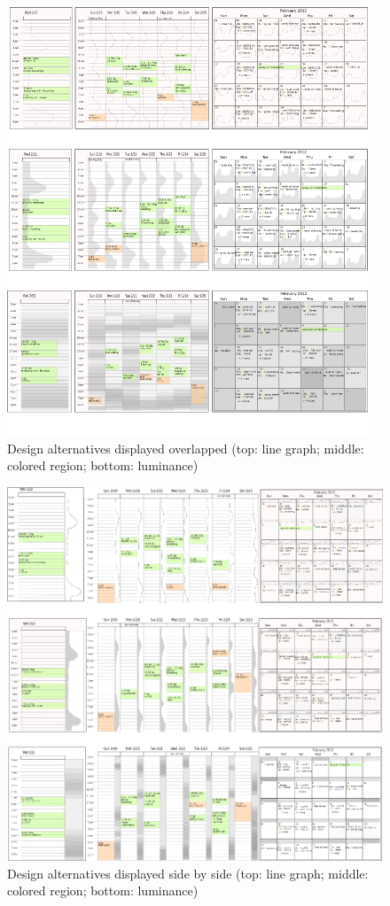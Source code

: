 \documentclass[12pt,oneside]{book}
\begin{document}
\begin{figure}[ht]
\centering
\includegraphics[width=\columnwidth]{figures/proto_incell}
\caption{Design alternatives displayed overlapped (top: line graph; middle: colored region; bottom: luminance)}
\label{fig:incell}
\end{figure}

\begin{figure}
\centering
\includegraphics[width=\columnwidth]{figures/proto_inband}
\caption{Design alternatives displayed side by side (top: line graph; middle: colored region; bottom: luminance)}
\label{fig:inband}
\end{figure}
\end{document}
